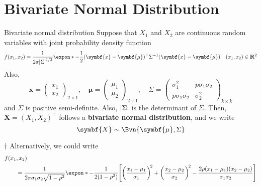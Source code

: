 \section{Bivariate Normal Distribution}
\begin{Definition}{Bivariate normal distribution}{}
    Suppose that $ X_1 $ and $ X_2 $
    are continuous random variables with joint probability
    density function
    \[ f(x_1,x_2)=\frac{1}{2\pi\abs*{\Sigma}^{1/2}}
        \expon*{-\frac{1}{2}(\symbf{x}-\symbf{\mu})^\top \Sigma^{-1}(\symbf{x}-\symbf{\mu})}\quad(x_1,x_2)\in\mathbf{R}^2     \]
    Also,
    \[ \symbf{x}=\begin{pmatrix}
            x_1 \\
            x_2
        \end{pmatrix}_{2\times 1},\quad
        \symbf{\mu}=\begin{pmatrix}
            \mu_1 \\
            \mu_2
        \end{pmatrix}_{2\times 1},\quad
        \Sigma=
        \begin{pmatrix}
            \sigma_1^2        & p\sigma_1\sigma_2 \\
            p\sigma_1\sigma_2 & \sigma_2^2
        \end{pmatrix}_{k\times k} \]
    and $ \Sigma $ is positive semi-definite. Also,
    $ \abs*{\Sigma} $ is the determinant of $ \Sigma $.
    Then, $ \symbf{X}=(X_1,X_2)^\top $ follows a \textbf{bivariate normal distribution},
    and we write
    \[ \symbf{X}\sim\Bvn{\symbf{\mu},\Sigma}  \]
\end{Definition}
\begin{Remark}{$ \dagger $}{}
    Alternatively, we could write
    \begin{align*}
        f(x_1 & ,x_2)                                          \\
              & =\frac{1}{2\pi\sigma_1\sigma_2\sqrt{1-\rho^2}}
        \expon*{-\frac{1}{2(1-\rho^2)}
            \Biggl[ \biggl( \frac{x_1-\mu_1}{\sigma_1}  \biggr)^{\!2}+
                \biggl( \frac{x_2-\mu_2}{\sigma_2}  \biggr)^{\!2}-
                \frac{2\rho(x_1-\mu_1)(x_2-\mu_2)}{\sigma_1\sigma_2} \Biggr]}
    \end{align*}
\end{Remark}
